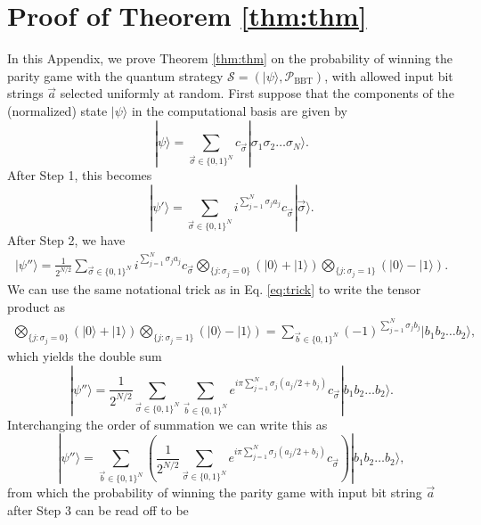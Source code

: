 \documentclass[prb,twocolumn,showpacs,amssymb,superscriptaddress]{revtex4-2}
\begin{document}
\section{Proof of Theorem \ref{thm:thm}}
\label{app:Theorem1}
In this Appendix, we prove Theorem \ref{thm:thm} on the probability of winning the parity game with the quantum strategy $\mathcal{S} = (|\psi\rangle,\mathcal{P}_{\mathrm{BBT}})$, with allowed input bit strings $\vec{a}$ selected uniformly at random. First suppose that the components of the (normalized) state $|\psi\rangle$ in the computational basis are given by
\begin{equation}
    |\psi\rangle = \sum_{\vec{\sigma} \in \{0,1\}^N} c_{\vec{\sigma}} | \sigma_1 \sigma_2\ldots \sigma_N \rangle.
\end{equation}
After Step 1, this becomes
\begin{equation}
\label{eq:trick}
|\psi'\rangle = \sum_{\vec{\sigma} \in \{0,1\}^N} i^{\sum_{j=1}^N \sigma_j a_j} c_{\vec{\sigma}}|\vec{\sigma}\rangle.
\end{equation}
After Step 2, we have
\begin{align}
\nonumber |\psi''\rangle = \frac{1}{2^{N/2}} \sum_{\vec{\sigma} \in \{0,1\}^N} i^{\sum_{j=1}^N \sigma_j a_j} c_{\vec{\sigma}} \bigotimes_{\{j:\sigma_j=0\}} (|0\rangle+|1\rangle)  \bigotimes_{\{j:\sigma_j=1\}} (|0\rangle-|1\rangle).
\end{align}
We can use the same notational trick as in Eq. \eqref{eq:trick} to write the tensor product as
\begin{align}
\bigotimes_{\{j:\sigma_j=0\}} (|0\rangle+|1\rangle)  \bigotimes_{\{j:\sigma_j=1\}} (|0\rangle-|1\rangle) = \sum_{\vec{b}\in \{0,1\}^N} (-1)^{\sum_{j=1}^N\sigma_j b_j} |b_1 b_2\ldots b_2 \rangle,
\end{align}
which yields the double sum
\begin{equation}
|\psi''\rangle = \frac{1}{2^{N/2}} \sum_{\vec{\sigma} \in \{0,1\}^N}\sum_{\vec{b}\in \{0,1\}^N} e^{i\pi \sum_{j=1}^N \sigma_j(a_j/2+b_j)} c_{\vec{\sigma}} |b_1 b_2\ldots b_2 \rangle.
\end{equation}
Interchanging the order of summation we can write this as
\begin{equation}
|\psi''\rangle = \sum_{\vec{b}\in \{0,1\}^N} \left(\frac{1}{2^{N/2}} \sum_{\vec{\sigma} \in \{0,1\}^N} e^{i\pi \sum_{j=1}^N \sigma_j(a_j/2+b_j)} c_{\vec{\sigma}}\right) |b_1 b_2\ldots b_2 \rangle,
\end{equation}
from which the probability of winning the parity game with input bit string $\vec{a}$ after Step 3 can be read off to be
\end{document}
